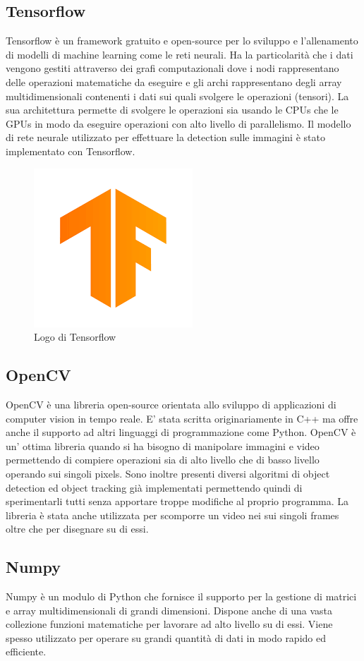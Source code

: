 \subsection{Tensorflow}
Tensorflow\cite{tensorflow} è un framework gratuito e open-source per lo sviluppo e l'allenamento di modelli di machine learning come le reti neurali. Ha la particolarità che i dati vengono gestiti attraverso dei grafi computazionali dove i nodi rappresentano delle operazioni matematiche da eseguire e gli archi rappresentano degli array multidimensionali contenenti i dati sui quali svolgere le operazioni (tensori). La sua architettura permette di svolgere le operazioni sia usando le CPUs che le GPUs in modo da eseguire operazioni con alto livello di parallelismo. Il modello di rete neurale utilizzato per effettuare la detection sulle immagini è stato implementato con Tensorflow.
\begin{figure}[H]
	\centering
	\includegraphics[width=0.3\linewidth]{images/logo-tensorflow.png}
	\caption{Logo di Tensorflow}
	\label{Logo di Tensorflow}
\end{figure}
\subsection{OpenCV}
OpenCV\cite{opencv} è una libreria open-source orientata allo sviluppo di applicazioni di computer vision in tempo reale. E' stata scritta originariamente in C++ ma offre anche il supporto ad altri linguaggi di programmazione come Python. OpenCV è un' ottima libreria quando si ha bisogno di manipolare immagini e video permettendo di compiere operazioni sia di alto livello che di basso livello operando sui singoli pixels. Sono inoltre presenti diversi algoritmi di object detection ed object tracking già implementati permettendo quindi di sperimentarli tutti senza apportare troppe modifiche al proprio programma. La libreria è stata anche utilizzata per scomporre un video nei sui singoli frames oltre che per disegnare su di essi.
\subsection{Numpy}
Numpy\cite{numpy} è un modulo di Python che fornisce il supporto per la gestione di matrici e array multidimensionali di grandi dimensioni. Dispone anche di una vasta collezione funzioni matematiche per lavorare ad alto livello su di essi. Viene spesso utilizzato per operare su grandi quantità di dati in modo rapido ed efficiente.
